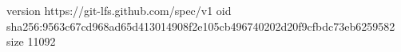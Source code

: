 version https://git-lfs.github.com/spec/v1
oid sha256:9563c67cd968ad65d413014908f2e105cb496740202d20f9cfbdc73eb6259582
size 11092
